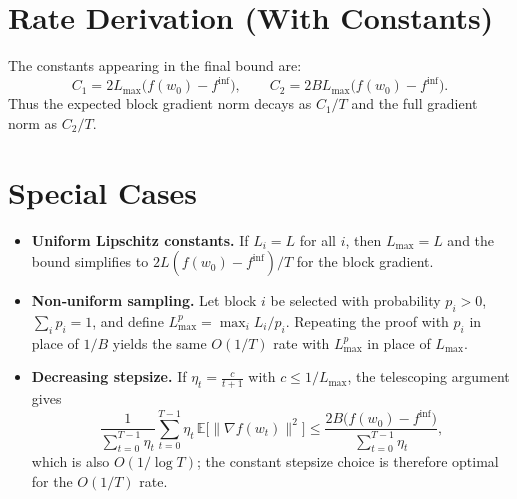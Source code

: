 \documentclass{article}
\begin{document}
\section*{Rate Derivation (With Constants)}
The constants appearing in the final bound are:
\[
C_{1}=2L_{\max}\bigl(f(w_{0})-f^{\inf}\bigr),\qquad
C_{2}=2BL_{\max}\bigl(f(w_{0})-f^{\inf}\bigr).
\]
Thus the expected block gradient norm decays as $C_{1}/T$ and the full gradient norm as $C_{2}/T$.

\section*{Special Cases}
\begin{itemize}
\item \textbf{Uniform Lipschitz constants.} If $L_{i}=L$ for all $i$, then $L_{\max}=L$ and the bound simplifies to $2L(f(w_{0})-f^{\inf})/T$ for the block gradient.
\item \textbf{Non‑uniform sampling.} Let block $i$ be selected with probability $p_{i}>0$, $\sum_{i}p_{i}=1$, and define $L_{\max}^{p}=\max_{i}L_{i}/p_{i}$. Repeating the proof with $p_{i}$ in place of $1/B$ yields the same $O(1/T)$ rate with $L_{\max}^{p}$ in place of $L_{\max}$.
\item \textbf{Decreasing stepsize.} If $\eta_{t}= \frac{c}{t+1}$ with $c\le 1/L_{\max}$, the telescoping argument gives
\[
\frac{1}{\sum_{t=0}^{T-1}\eta_{t}}\sum_{t=0}^{T-1}\eta_{t}\,
\mathbb{E}\bigl[\|\nabla f(w_{t})\|^{2}\bigr]
\le \frac{2B\bigl(f(w_{0})-f^{\inf}\bigr)}{\sum_{t=0}^{T-1}\eta_{t}},
\]
which is also $O(1/\log T)$; the constant stepsize choice is therefore optimal for the $O(1/T)$ rate.
\end{itemize}
\end{document}
